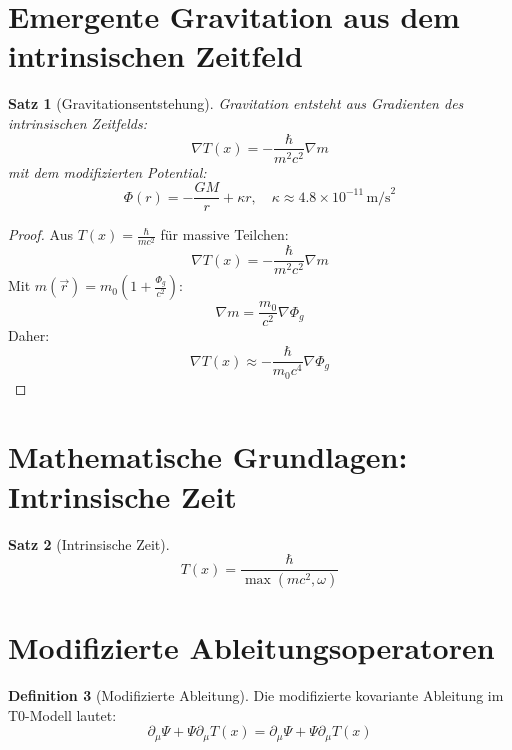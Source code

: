 \documentclass[12pt,a4paper]{article}
\newcommand{\Tfield}{T(x)}
\newcommand{\DcovT}[1]{\partial_\mu #1 + #1 \partial_\mu \Tfield}
\newtheorem{theorem}{Satz}[section]
\theoremstyle{definition}
\newtheorem{definition}[theorem]{Definition}
\theoremstyle{remark}
\begin{document}
	\section{Emergente Gravitation aus dem intrinsischen Zeitfeld}
	\begin{theorem}[Gravitationsentstehung]
		Gravitation entsteht aus Gradienten des intrinsischen Zeitfelds:
		\begin{equation}
			\nabla \Tfield = -\frac{\hbar}{m^2 c^2} \nabla m
		\end{equation}
		mit dem modifizierten Potential:
		\begin{equation}
			\Phi(r) = -\frac{GM}{r} + \kappa r, \quad \kappa \approx 4.8 \times 10^{-11} \, \text{m/s}^2
		\end{equation}
	\end{theorem}
	
	\begin{proof}
		Aus \( \Tfield = \frac{\hbar}{m c^2} \) für massive Teilchen:
		\begin{equation}
			\nabla \Tfield = -\frac{\hbar}{m^2 c^2} \nabla m
		\end{equation}
		Mit \( m(\vec{r}) = m_0 (1 + \frac{\Phi_g}{c^2}) \):
		\begin{equation}
			\nabla m = \frac{m_0}{c^2} \nabla \Phi_g
		\end{equation}
		Daher:
		\begin{equation}
			\nabla \Tfield \approx -\frac{\hbar}{m_0 c^4} \nabla \Phi_g
		\end{equation}
	\end{proof}
	
	\section{Mathematische Grundlagen: Intrinsische Zeit}
	\begin{theorem}[Intrinsische Zeit]
		\begin{equation}
			\Tfield = \frac{\hbar}{\max(m c^2, \omega)}
		\end{equation}
	\end{theorem}
	
	\section{Modifizierte Ableitungsoperatoren}
	\begin{definition}[Modifizierte Ableitung]
		Die modifizierte kovariante Ableitung im T0-Modell lautet:
		\begin{equation}
			\DcovT{\Psi} = \partial_\mu \Psi + \Psi \partial_\mu \Tfield
		\end{equation}
	\end{definition}
	
\end{document}

